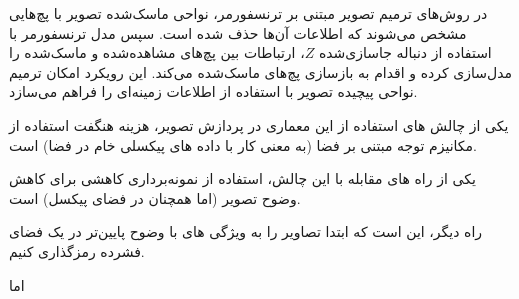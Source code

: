 در روش‌های ترمیم تصویر مبتنی بر ترنسفورمر، نواحی ماسک‌شده تصویر با پچ‌هایی مشخص می‌شوند که اطلاعات آن‌ها حذف شده است. سپس مدل ترنسفورمر با استفاده از دنباله جاسازی‌شده $Z$، ارتباطات بین پچ‌های مشاهده‌شده و ماسک‌شده را مدل‌سازی کرده و اقدام به بازسازی پچ‌های ماسک‌شده می‌کند. این رویکرد امکان ترمیم نواحی پیچیده تصویر با استفاده از اطلاعات زمینه‌ای را فراهم می‌سازد.



یکی از چالش های استفاده از این معماری در پردازش تصویر، هزینه هنگفت  استفاده از مکانیزم توجه مبتنی بر فضا (به معنی کار با داده های پیکسلی خام در فضا) است.

یکی از راه های مقابله با این چالش،‌ استفاده از نمونه‌برداری کاهشی برای کاهش وضوح تصویر (اما همچنان در فضای پیکسل) است. 


راه دیگر، این است که ابتدا تصاویر را به ویژگی های با وضوح پایین‌تر در یک فضای فشرده رمزگذاری کنیم.

اما 

